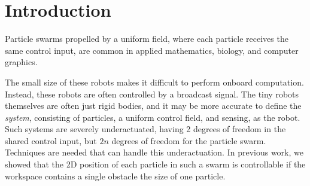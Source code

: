 \section{Introduction}\label{sec:Intro}
Particle swarms propelled by a uniform field, where each particle  receives the same control input, are common in applied mathematics, biology, and computer graphics. 

The small size of these robots makes it difficult to perform onboard computation.  Instead, these robots are often controlled by a broadcast signal. 
 The tiny robots themselves are often just rigid bodies, and it may be more accurate to define the \emph{system}, consisting of particles, a uniform control field, and sensing, as the robot.
Such systems are severely underactuated, having 2 degrees of freedom in the shared control input, but $2n$ degrees of freedom for the particle swarm.
 Techniques are needed that can handle this underactuation. 
 In previous work, we showed that the 2D position of each particle in such a swarm is controllable if the workspace contains a single obstacle the size of one particle.


